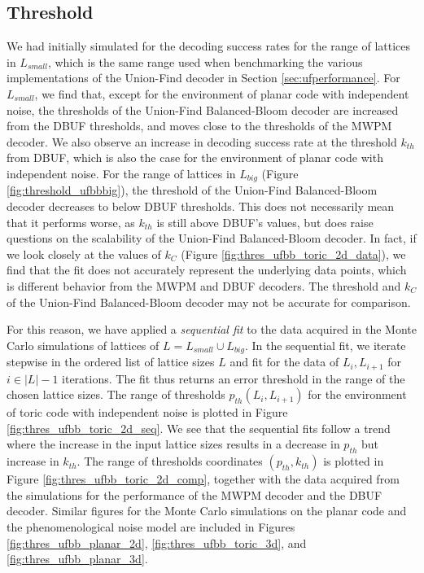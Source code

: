 \subsection{Threshold}

We had initially simulated for the decoding success rates for the range of lattices in $L_{small}$, which is the same range used when benchmarking the various implementations of the Union-Find decoder in Section \ref{sec:ufperformance}. For $L_{small}$, we find that, except for the environment of planar code with independent noise, the thresholds of the Union-Find Balanced-Bloom decoder are increased from the DBUF thresholds, and moves close to the thresholds of the MWPM decoder. We also observe an increase in decoding success rate at the threshold $k_{th}$ from DBUF, which is also the case for the environment of planar code with independent noise. For the range of lattices in $L_{big}$ (Figure \ref{fig:threshold_ufbbbig}), the threshold of the Union-Find Balanced-Bloom decoder decreases to below DBUF thresholds. This does not necessarily mean that it performs worse, as $k_{th}$ is still above DBUF's values, but does raise questions on the scalability of the Union-Find Balanced-Bloom decoder. In fact, if we look closely at the values of $k_C$ (Figure \ref{fig:thres_ufbb_toric_2d_data}), we find that the fit does not accurately represent the underlying data points, which is different behavior from the MWPM and DBUF decoders. The threshold and $k_C$ of the Union-Find Balanced-Bloom decoder may not be accurate for comparison. 

For this reason, we have applied a \emph{sequential fit} to the data acquired in the Monte Carlo simulations of lattices of $L = L_{small} \cup L_{big}$. In the sequential fit, we iterate stepwise in the ordered list of lattice sizes $L$ and fit for the data of $L_i, L_{i+1}$ for $i \in |L|-1$ iterations. The fit thus returns an error threshold in the range of the chosen lattice sizes. The range of thresholds $p_{th}(L_i, L_{i+1})$ for the environment of toric code with independent noise is plotted in Figure \ref{fig:thres_ufbb_toric_2d_seq}. We see that the sequential fits follow a trend where the increase in the input lattice sizes results in a decrease in $p_{th}$ but increase in $k_{th}$. The range of thresholds coordinates $(p_{th}, k_{th})$ is plotted in Figure \ref{fig:thres_ufbb_toric_2d_comp}, together with the data acquired from the simulations for the performance of the MWPM decoder and the DBUF decoder. Similar figures for the Monte Carlo simulations on the planar code and the phenomenological noise model are included in Figures \ref{fig:thres_ufbb_planar_2d}, \ref{fig:thres_ufbb_toric_3d}, and \ref{fig:thres_ufbb_planar_3d}. 

